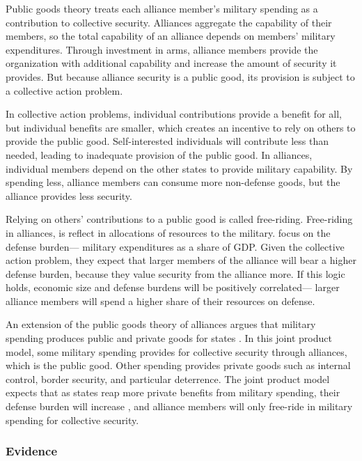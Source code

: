 \documentclass[12pt]{article}
\begin{document}
Public goods theory treats each alliance member's military spending as a contribution to collective security. 
Alliances aggregate the capability of their members, so the total capability of an alliance depends on members' military expenditures. 
Through investment in arms, alliance members provide the organization with additional capability and increase the amount of security it provides. 
But because alliance security is a public good, its provision is subject to a collective action problem. 


In collective action problems, individual contributions provide a benefit for all, but individual benefits are smaller, which creates an incentive to rely on others to provide the public good.
Self-interested individuals will contribute less than needed, leading to inadequate provision of the public good. 
In alliances, individual members depend on the other states to provide military capability. 
By spending less, alliance members can consume more non-defense goods, but the alliance provides less security.


Relying on others' contributions to a public good is called free-riding.
Free-riding in alliances, is reflect in allocations of resources to the military.  
\citet{OlsonZeckhauser1966} focus on the defense burden--- military expenditures as a share of GDP. 
Given the collective action problem, they expect that larger members of the alliance will bear a higher defense burden, because they value security from the alliance more. 
If this logic holds, economic size and defense burdens will be positively correlated--- larger alliance members will spend a higher share of their resources on defense. 


An extension of the public goods theory of alliances argues that military spending produces public and private goods for states \citep{Hansenetal1990, Murdoch1995}. 
In this joint product model, some military spending provides for collective security through alliances, which is the public good. 
Other spending provides private goods such as internal control, border security, and particular deterrence. 
The joint product model expects that as states reap more private benefits from military spending, their defense burden will increase \citep{SandlerHartley2001}, and alliance members will only free-ride in military spending for collective security. 



\subsubsection{Evidence}
\end{document}
